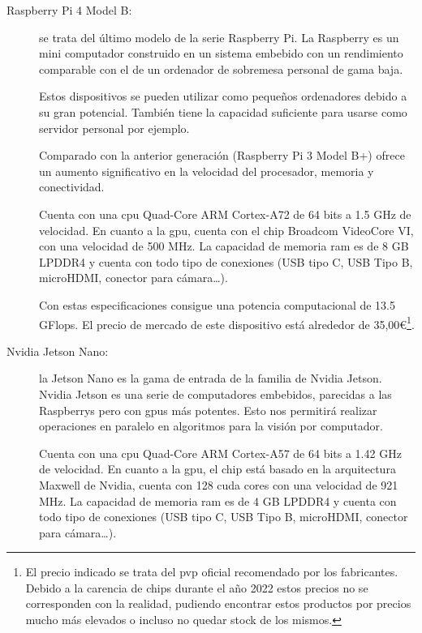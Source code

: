 \begin{description}
    \item[Raspberry Pi 4 Model B:]
    
    se trata del último modelo de la serie Raspberry Pi. La Raspberry es un mini computador construido en un sistema embebido con un rendimiento comparable con el de un ordenador de sobremesa personal de gama baja.
    
    Estos dispositivos se pueden utilizar como pequeños ordenadores debido a su gran potencial.
    También tiene la capacidad suficiente para usarse como servidor personal por ejemplo.

    Comparado con la anterior generación (Raspberry Pi 3 Model B+) ofrece un aumento significativo en la velocidad del procesador, memoria y conectividad.

    Cuenta con una \gls{cpu} Quad-Core ARM Cortex-A72 de 64 bits a 1.5 GHz de velocidad.
    En cuanto a la \gls{gpu}, cuenta con el chip Broadcom VideoCore VI, con una velocidad de 500 MHz.
    La capacidad de memoria \gls{ram} es de 8 GB LPDDR4 y cuenta con todo tipo de conexiones (USB tipo C, USB Tipo B, microHDMI, conector para cámara\dots).
    
    Con estas especificaciones consigue una potencia computacional de 13.5 GFlops.
    El precio de mercado de este dispositivo está alrededor de 35,00€\footnote{\label{fn:price}El precio indicado se trata del \gls{pvp} oficial recomendado por los fabricantes. Debido a la carencia de chips durante el año 2022 estos precios no se corresponden con la realidad, pudiendo encontrar estos productos por precios mucho más elevados o incluso no quedar stock de los mismos.}.

    \item[Nvidia Jetson Nano:]
    
    la Jetson Nano es la gama de entrada de la familia de Nvidia Jetson.
    Nvidia Jetson es una serie de computadores embebidos, parecidas a las Raspberrys pero con \gls{gpu}s más potentes.
    Esto nos permitirá realizar operaciones en paralelo en algoritmos para la visión por computador.

    Cuenta con una \gls{cpu} Quad-Core ARM Cortex-A57 de 64 bits a 1.42 GHz de velocidad.
    En cuanto a la \gls{gpu}, el chip está basado en la arquitectura Maxwell de Nvidia, cuenta con 128 \gls{cuda} cores con una velocidad de 921 MHz.
    La capacidad de memoria \gls{ram} es de 4 GB LPDDR4 y cuenta con todo tipo de conexiones (USB tipo C, USB Tipo B, microHDMI, conector para cámara\dots).


\end{description}

